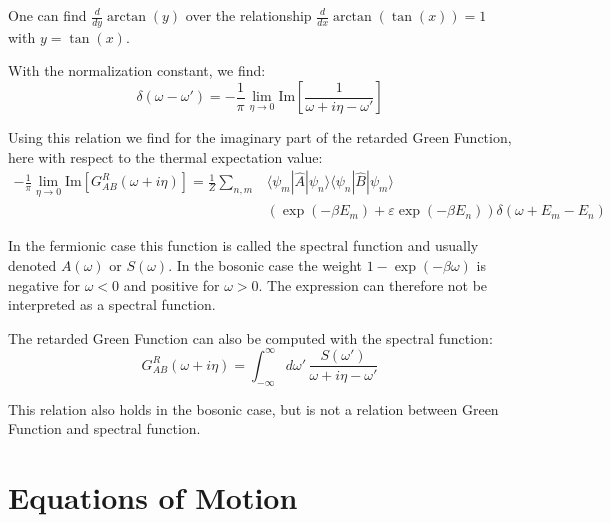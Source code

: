 One can find $\frac{d}{dy} \arctan(y)$ over the relationship $\frac{d}{dx} \arctan(\tan(x)) = 1$ with $y = \tan(x)$.

With the normalization constant, we find:
\begin{equation*}
    \delta(\omega - \omega') = -\frac{1}{\pi} \lim_{\eta \to 0} \mathrm{Im} \left[ \frac{1}{\omega + i\eta - \omega'} \right]
\end{equation*}

Using this relation we find for the imaginary part of the retarded Green Function, here with respect to the thermal expectation value:
\begin{align*}
    -\frac{1}{\pi} \lim_{\eta \to 0} \mathrm{Im} \left[ G^{R}_{AB}(\omega + i\eta) \right] = \frac{1}{Z} \sum_{n,m} &\langle\psi_m| \hat{A} |\psi_n\rangle\langle\psi_n| \hat{B} |\psi_m\rangle \\
    &\left( \exp(-\beta E_m) + \varepsilon \exp(-\beta E_n) \right) \delta(\omega + E_m - E_n)
\end{align*}

In the fermionic case this function is called the spectral function and usually denoted $A(\omega)$ or $S(\omega)$.
In the bosonic case the weight $1-\exp(-\beta \omega)$ is negative for $\omega < 0$ and positive for $\omega > 0$.
The expression can therefore not be interpreted as a spectral function.

The retarded Green Function can also be computed with the spectral function:
\begin{equation}
    G^{R}_{AB}(\omega + i\eta) = \int_{-\infty}^{\infty} d\omega'\, \frac{S(\omega')}{\omega + i\eta - \omega'} \label{eq:spectral-function-integral-relation}
\end{equation}

This relation also holds in the bosonic case, but is not a relation between Green Function and spectral function.

\section{Equations of Motion}

